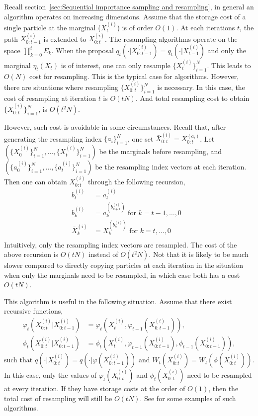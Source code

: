Recall section~\ref{sec:Sequential importance sampling and resampling}, in
general an \sis algorithm operates on increasing dimensions. Assume that the
storage cost of a single particle at the marginal ($X_t^{(i)}$) is of order
$O(1)$. At each iterations $t$, the path $X_{0:t-1}^{(i)}$ is extended to
$X_{0:t}^{(i)}$. The resampling algorithms operate on the space
$\prod_{k=0}^tE_k$. When the proposal $q_t(\cdot|X_{0:t-1}^{(i)}) =
q_t(\cdot|X_{t-1}^{(i)})$ and only the marginal $\eta_t(X_t)$ is of interest,
one can only resample $\{X_t^{(i)}\}_{i=1}^N$. This leads to $O(N)$ cost for
resampling. This is the typical case for \smc algorithms. However, there are
situations where resampling $\{X_{0:t}^{(i)}\}_{i=1}^N$ is necessary. In this
case, the cost of resampling at iteration $t$ is $O(tN)$. And total resampling
cost to obtain $\{X_{0:t}^{(i)}\}_{i=1}^N$, is $O(t^2N)$.

However, such cost is avoidable in some circumstances. Recall that, after
generating the resampling index $\{a_i\}_{i=1}^N$, one set $\bar{X}_{0:t}^{(i)}
= X_{0:t}^{(a_i)}$. Let $(\{X_0^{(i)}\}_{i=1}^N,\dots,\{X_t^{(i)}\}_{i=1}^N)$
be the marginals before resampling, and
$(\{a_0^{(i)}\}_{i=1}^N,\dots,\{a_t^{(i)}\}_{i=1}^N)$ be the resampling index
vectors at each iteration. Then one can obtain $X_{0:t}^{(i)}$ through
the following recursion,
\begin{align*}
  b_t^{(i)} &= a_t^{(i)} & \\
  b_k^{(i)} &= a_{k}^{(b_{k + 1}^{(i)})} \text{ for } k = t - 1,\dots,0 \\
  \bar{X}_k^{(i)} &= X_k^{(b_k^{(i)})}   \text{ for } k = t,\dots,0\ \\
\end{align*}
Intuitively, only the resampling index vectors are resampled. The cost of the
above recursion is $O(tN)$ instead of $O(t^2N)$. Not that it is likely to be
much slower compared to directly copying particles at each iteration in the
situation when only the marginals need to be resampled, in which case both has
a cost $O(tN)$.

This algorithm is useful in the following situation. Assume that there exist
recursive functions,
\begin{align*}
\varphi_t(X_{0:t}^{(i)}|X_{0:t-1}^{(i)}) &=
\varphi_t(X_t^{(i)}, \varphi_{t-1}(X_{0:t-1}^{(i)})), \\
\phi_t(X_{0:t}^{(i)}|X_{0:t-1}^{(i)}) &=
\phi_t(X_t^{(i)}, \varphi_{t-1}(X_{0:t-1}^{(i)}), \phi_{t-1}(X_{0:t-1}^{(i)})),
\end{align*}
such that
$q(\cdot|X_{0:t}^{(i)}) = q(\cdot|\varphi(X_{0:t-1}^{(i)}))$ and
$W_t(X_{0:t}^{(i)}) = W_t(\phi(X_{0:t}^{(i)}))$. In this case, only the values
of $\varphi_t(X_{0:t}^{(i)})$ and $\phi_t(X_{0:t}^{(i)})$ need to be resampled
at every iteration. If they have storage costs at the order of $O(1)$, then the
total cost of resampling will still be $O(tN)$. See \textcite{stpf} for some
examples of such algorithms.

